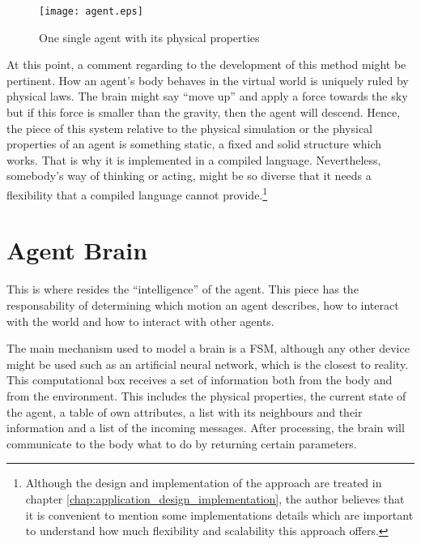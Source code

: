 \begin{figure}[!htb]
  \centering
  \texttt{[image: agent.eps]}
  \caption{One single agent with its physical properties}
  \label{fig:navigation}
\end{figure}

At this point, a comment regarding to the development of this method might be pertinent. How an agent's body behaves in the virtual world is uniquely ruled by physical laws. The brain might say ``move up'' and apply a force towards the sky but if this force is smaller than the gravity, then the agent will descend. Hence, the piece of this system relative to the physical simulation or the physical properties of an agent is something static, a fixed and solid structure which works. That is why it is implemented in a compiled language. Nevertheless, somebody's way of thinking or acting, might be so diverse that it needs a flexibility that a compiled language cannot provide.\footnote{Although the design and implementation of the approach are treated in chapter \ref{chap:application_design_implementation}, the author believes that it is convenient to mention some implementations details which are important to understand how much flexibility and scalability this approach offers.}

\section{Agent Brain}
This is where resides the ``intelligence'' of the agent. This piece has the responsability of determining which motion an agent describes, how to interact with the world and how to interact with other agents.

The main mechanism used to model a brain is a FSM, although any other device might be used such as an artificial neural network, which is the closest to reality. This computational box receives a set of information both from the body and from the environment. This includes the physical properties, the current state of the agent, a table of own attributes, a list with its neighbours and their information and a list of the incoming messages. After processing, the brain will communicate to the body what to do by returning certain parameters.

